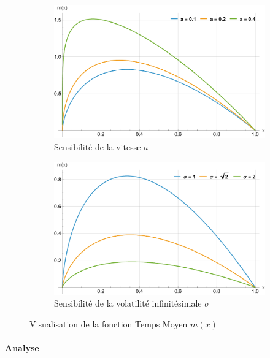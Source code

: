 \begin{figure}[htb]
    \centering
    \begin{subfigure}{0.45\linewidth}
        \includegraphics[width=\linewidth]{img/validation/Mean/mean_a.pdf}
        \caption{Sensibilité de la vitesse $a$}\label{fig:Mean_a_visualisation}
    \end{subfigure}
    \hfill
    \begin{subfigure}{0.45\linewidth}
        \includegraphics[width=\linewidth]{img/validation/Mean/mean_sigma.pdf}
        \caption{Sensibilité de la volatilité infinitésimale $\sigma$}\label{fig:Mean_sigma_visualisation}
    \end{subfigure}
    \caption{Visualisation de la fonction Temps Moyen $m(x)$}\label{fig:MeanVisualisation}
\end{figure}
\FloatBarrier\paragraph{Analyse}\phantom{}\\
